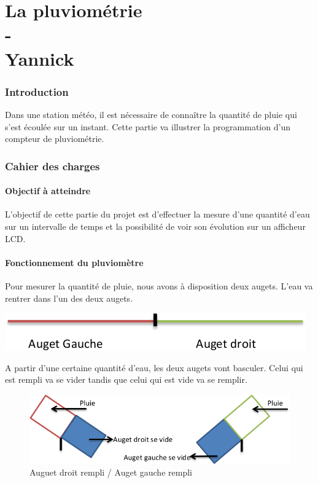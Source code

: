 \documentclass[a4paper]{report}
\begin{document}
\part{La pluviométrie\\-\\Yannick {}}
\section{Introduction}
Dans une station météo, il est nécessaire de connaître la quantité de pluie qui s’est écoulée sur un instant.
Cette partie va illustrer la programmation d’un compteur de pluviométrie.
\section{Cahier des charges}
\subsection{Objectif à atteindre}
L'objectif de cette partie du projet est d’effectuer la mesure d’une quantité d’eau sur un intervalle de temps et la possibilité de voir son évolution sur un afficheur LCD.
\subsection{Fonctionnement du pluviomètre}
Pour mesurer la quantité de pluie, nous avons à disposition deux augets. L’eau va rentrer dans l’un des deux augets.

\begin{center}
	\includegraphics[scale=0.4]{images/PLUV_fig1.png}
\end{center}

A partir d’une certaine quantité d’eau, les deux augets vont basculer.
Celui qui est rempli va se vider tandis que celui qui est vide va se remplir.

\begin{figure}[h!]
	\centering
	\includegraphics[scale=0.4]{images/PLUV_fig2.png}
	\caption{Auguet droit rempli / Auget gauche rempli\label{PLUV-fig2}}
\end{figure}
\end{document}
